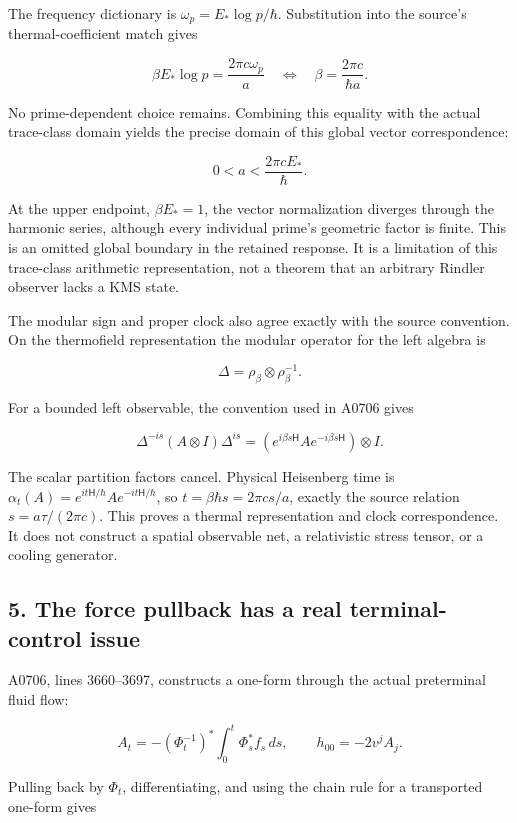 \documentclass[10pt,a4paper,oneside]{report}
\begin{document}
The frequency dictionary is \(\omega_p=E_*\log p/\hbar\). Substitution
into the source's thermal-coefficient match gives

\[
\beta E_*\log p=\frac{2\pi c\omega_p}{a}
\quad\Longleftrightarrow\quad
\beta=\frac{2\pi c}{\hbar a}.
\]

No prime-dependent choice remains. Combining this equality with the
actual trace-class domain yields the precise domain of this global
vector correspondence:

\[
0<a<\frac{2\pi cE_*}{\hbar}.
\]

At the upper endpoint, \(\beta E_*=1\), the vector normalization
diverges through the harmonic series, although every individual prime's
geometric factor is finite. This is an omitted global boundary in the
retained response. It is a limitation of this trace-class arithmetic
representation, not a theorem that an arbitrary Rindler observer lacks a
KMS state.

The modular sign and proper clock also agree exactly with the source
convention. On the thermofield representation the modular operator for
the left algebra is

\[
\Delta=\rho_\beta\otimes\rho_\beta^{-1}.
\]

For a bounded left observable, the convention used in A0706 gives

\[
\Delta^{-is}(A\otimes I)\Delta^{is}
=(e^{i\beta s\mathsf H}Ae^{-i\beta s\mathsf H})\otimes I.
\]

The scalar partition factors cancel. Physical Heisenberg time is
\(\alpha_t(A)=e^{it\mathsf H/\hbar}Ae^{-it\mathsf H/\hbar}\), so
\(t=\beta\hbar s=2\pi cs/a\), exactly the source relation
\(s=a\tau/(2\pi c)\). This proves a thermal representation and clock
correspondence. It does not construct a spatial observable net, a
relativistic stress tensor, or a cooling generator.

\subsection{5. The force pullback has a real terminal-control
issue}\label{proof10:the-force-pullback-has-a-real-terminal-control-issue}

A0706, lines 3660--3697, constructs a one-form through the actual
preterminal fluid flow:

\[
A_t=-(\Phi_t^{-1})^*\int_0^t\Phi_s^*f_s\,ds,
\qquad h_{00}=-2v^jA_j.
\]

Pulling back by \(\Phi_t\), differentiating, and using the chain rule
for a transported one-form gives
\end{document}
